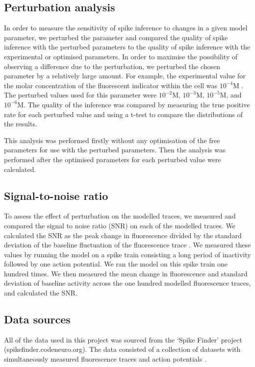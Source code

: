 \documentclass[a4paper,12pt]{article}
\theoremstyle{definition}
\begin{document}
\subsection{Perturbation analysis}
In order to measure the sensitivity of spike inference to changes in a given model parameter, we perturbed the parameter and compared the quality of spike inference with the perturbed parameters to the quality of spike inference with the experimental or optimised parameters. In order to maximise the possibility of observing a difference due to the perturbation, we perturbed the chosen parameter by a relatively large amount. For example, the experimental value for the molar concentration of the fluorescent indicator within the cell was $10^{−4}$M \cite{maravall}. The perturbed values used for this parameter were $10^{−2}$M, $10^{−3}$M, $10^{−5}$M, and $10^{−6}$M. The quality of the inference was compared by measuring the true positive rate for each perturbed value and using a t-test to compare the distributions of the results.

This analysis was performed firstly without any optimisation of the free parameters for use with the perturbed parameters. Then the analysis was performed after the optimised parameters for each perturbed value were calculated.

\subsection{Signal-to-noise ratio}
To assess the effect of perturbation on the modelled traces, we measured and compared the signal to noise ratio (SNR) on each of the modelled traces. We calculated the SNR as the peak change in fluorescence divided by the standard deviation of the baseline fluctuation of the fluorescence trace \cite{tada}. We measured these values by running the model on a spike train consisting a long period of inactivity followed by one action potential. We ran the model on this spike train one hundred times. We then measured the mean change in fluorescence and standard deviation of baseline activity across the one hundred modelled fluorescence traces, and calculated the SNR.

\subsection{Data sources}
All of the data used in this project was sourced from the ‘Spike Finder’ project (spikefinder.codeneuro.org). The data consisted of a collection of datasets with simultaneously measured fluorescence traces and action potentials \cite{berens}.

\newpage


\end{document}
